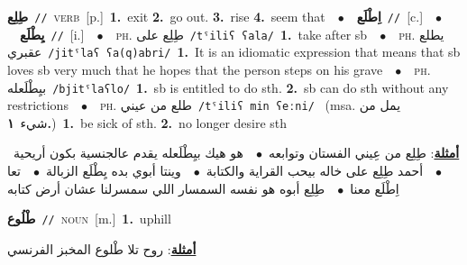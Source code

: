\documentclass[10pt,a4paper,twoside]{article} %
\begin{document}
\begin{multicols}{2}
{\setlength\topsep{0pt}\textbf{\foreignlanguage{arabic}{طِلِع}}\ {\color{gray}\texttt{//}\color{black}}\ \textsc{verb}\ [p.]\ \textbf{1.}~exit  \textbf{2.}~go out.  \textbf{3.}~rise  \textbf{4.}~seem that\ \ $\bullet$\ \ \setlength\topsep{0pt}\textbf{\foreignlanguage{arabic}{اِطْلَع}}\ {\color{gray}\texttt{//}\color{black}}\ [c.]\ \ $\bullet$\ \ \setlength\topsep{0pt}\textbf{\foreignlanguage{arabic}{يِطْلَع}}\ {\color{gray}\texttt{//}\color{black}}\ [i.]\ \ $\bullet$\ \ \textsc{ph.} \color{gray} \foreignlanguage{arabic}{طِلِع على}\color{black}\ {\color{gray}\texttt{/{\sffamily tˤiliʕ ʕala}/}\color{black}}\ \textbf{1.}~take after sb\ \ $\bullet$\ \ \textsc{ph.} \color{gray} \foreignlanguage{arabic}{يطلع عقبري}\color{black}\ {\color{gray}\texttt{/{\sffamily jitˤlaʕ ʕa(q)abri}/}\color{black}}\ \textbf{1.}~It is an idiomatic expression that means that sb loves sb very much that he hopes that the person steps on his grave\ \ $\bullet$\ \ \textsc{ph.} \color{gray} \foreignlanguage{arabic}{بيِطْلَعله}\color{black}\ {\color{gray}\texttt{/{\sffamily bjitˤlaʕlo}/}\color{black}}\ \textbf{1.}~sb is entitled to do sth.  \textbf{2.}~sb can do sth without any restrictions\ \ $\bullet$\ \ \textsc{ph.} \color{gray} \foreignlanguage{arabic}{طلع من عيني}\color{black}\ {\color{gray}\texttt{/{\sffamily tˤiliʕ min ʕeːni}/}\color{black}}\ \color{gray} (msa. \foreignlanguage{arabic}{يمل من شيء}~\foreignlanguage{arabic}{\textbf{١.}})\color{black}\ \textbf{1.}~be sick of sth.  \textbf{2.}~no longer desire sth\  \begin{flushright}\color{gray}\foreignlanguage{arabic}{\textbf{\underline{\foreignlanguage{arabic}{أمثلة}}}: طِلِع من عِيني الفستان وتوابعه\ $\bullet$\ \  هو هيك بيِطْلَعله يقدم عالجنسية بكون أريحية\ $\bullet$\ \  أحمد طِلِع على خاله بيحب القراية والكتابة\ $\bullet$\ \  وينتا أبوي بده يِطْلَع الزبالة\ $\bullet$\ \  تعا اِطْلَع معنا\ $\bullet$\ \  طِلِع أبوه هو نفسه السمسار اللي سمسرلنا عشان أرض كتابه}\end{flushright}\color{black}} \vspace{2mm}

{\setlength\topsep{0pt}\textbf{\foreignlanguage{arabic}{طْلُوع}}\ {\color{gray}\texttt{//}\color{black}}\ \textsc{noun}\ [m.]\ \textbf{1.}~uphill\  \begin{flushright}\color{gray}\foreignlanguage{arabic}{\textbf{\underline{\foreignlanguage{arabic}{أمثلة}}}: روح تلا طْلوع المخبز الفرنسي}\end{flushright}\color{black}} \vspace{2mm}


\end{multicols}
\end{document}
